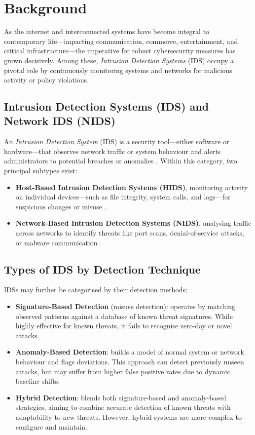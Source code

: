 \section{Background}

As the internet and interconnected systems have become integral to contemporary life—impacting communication, commerce, entertainment, and critical infrastructure—the imperative for robust cybersecurity measures has grown decisively. Among these, \emph{Intrusion Detection Systems} (IDS) occupy a pivotal role by continuously monitoring systems and networks for malicious activity or policy violations.

\subsection{Intrusion Detection Systems (IDS) and Network IDS (NIDS)}

An \emph{Intrusion Detection System} (IDS) is a security tool—either software or hardware—that observes network traffic or system behaviour and alerts administrators to potential breaches or anomalies \parencite{turn0search12}. Within this category, two principal subtypes exist:

\begin{itemize}
  \item \textbf{Host-Based Intrusion Detection Systems (HIDS)}, monitoring activity on individual devices—such as file integrity, system calls, and logs—for suspicious changes or misuse \parencite{turn0search12}.
  \item \textbf{Network-Based Intrusion Detection Systems (NIDS)}, analysing traffic across networks to identify threats like port scans, denial-of-service attacks, or malware communication \parencite{turn0search12}.
\end{itemize}

\subsection{Types of IDS by Detection Technique}

IDSs may further be categorised by their detection methods:

\begin{itemize}
  \item \textbf{Signature-Based Detection} (misuse detection): operates by matching observed patterns against a database of known threat signatures. While highly effective for known threats, it fails to recognise zero-day or novel attacks.
  \item \textbf{Anomaly-Based Detection}: builds a model of normal system or network behaviour and flags deviations. This approach can detect previously unseen attacks, but may suffer from higher false positive rates due to dynamic baseline shifts.
  \item \textbf{Hybrid Detection}: blends both signature-based and anomaly-based strategies, aiming to combine accurate detection of known threats with adaptability to new threats. However, hybrid systems are more complex to configure and maintain.
\end{itemize}

